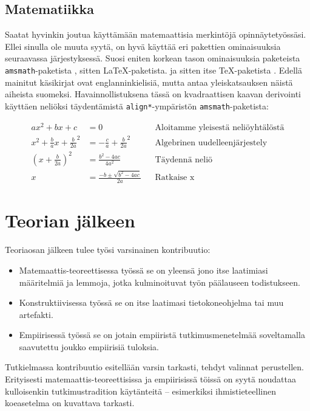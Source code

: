 \documentclass[utf8]{gradu3}
\begin{document}
\subsection{Matematiikka}

Saatat hyvinkin joutua käyttämään matemaattisia merkintöjä opinnäytetyössäsi.
Ellei sinulla ole muuta syytä, on hyvä käyttää eri pakettien
ominaisuuksia seuraavassa järjestyksessä. Suosi eniten korkean tason
ominaisuuksia paketeista \texttt{amsmath}-paketista
\parencite[katso][]{amsmath-manual}, sitten \LaTeX-paketista.
\parencite[katso][]{lamport94:_latex} ja sitten itse \TeX-paketista
\parencite[katso][]{knuth86:_texbook}. Edellä mainitut käsikirjat ovat
englanninkielisiä, mutta  antaa
yleiskatsauksen näistä aiheista suomeksi. Havainnollistuksena tässä on
kvadraattisen kaavan derivointi käyttäen neliöksi täydentämistä
\texttt{align*}-ympäristön \texttt{amsmath}-paketista:

\begin{align*}
  ax^2 + bx + c &= 0 && \text{Aloitamme yleisestä neliöyhtälöstä} \\
  x^2 + \frac{b}{a}x + \frac{b}{2a}^2 &= -\frac{c}{a} + \frac{b}{2a}^2 && \text{Algebrinen uudelleenjärjestely} \\
  \left(x + \frac{b}{2a}\right)^2 &= \frac{b^2 - 4ac}{4a^2} && \text{Täydennä neliö} \\
  x &= \frac{-b \pm \sqrt{b^2 - 4ac}}{2a} && \text{Ratkaise x}
\end{align*}

\section{Teorian jälkeen}

Teoriaosan jälkeen tulee työsi varsinainen kontribuutio:
\begin{itemize}
\item Matemaattis-teoreettisessa työssä se on yleensä jono itse
  laatimiasi määritelmiä ja lemmoja, jotka kulminoituvat työn
  päälauseen todistukseen.
\item Konstruktiivisessa työssä se on itse laatimasi tietokoneohjelma
  tai muu artefakti.
\item Empiirisessä työssä se on jotain empiiristä tutkimusmenetelmää
  soveltamalla saavutettu joukko empiirisiä tuloksia.
\end{itemize}

Tutkielmassa kontribuutio esitellään varsin tarkasti, tehdyt valinnat
perustellen.  Erityisesti matemaattis-teoreettisissa ja empiirisissä
töissä on syytä noudattaa kulloisenkin tutkimustradition käytänteitä
-- esimerkiksi ihmistieteellinen koeasetelma on kuvattava tarkasti.
\end{document}
